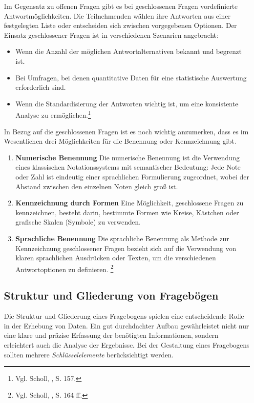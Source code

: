 Im Gegensatz zu offenen Fragen gibt es bei geschlossenen Fragen vordefinierte Antwortmöglichkeiten. Die Teilnehmenden
wählen ihre Antworten aus einer festgelegten Liste oder entscheiden sich zwischen vorgegebenen Optionen. Der Einsatz
geschlossener Fragen ist in verschiedenen Szenarien angebracht:

\begin{itemize}
    \item Wenn die Anzahl der möglichen Antwortalternativen bekannt und begrenzt ist.
    \item Bei Umfragen, bei denen quantitative Daten für eine statistische Auswertung erforderlich sind.
    \item Wenn die Standardisierung der Antworten wichtig ist, um eine konsistente Analyse zu ermöglichen.\footnote{Vgl. Scholl, \cite{Die Befragung}, S. 157.}\\
\end{itemize}

In Bezug auf die geschlossenen Fragen ist es noch wichtig anzumerken, dass es im Wesentlichen drei Möglichkeiten für die
Benennung oder Kennzeichnung gibt.
\begin{enumerate}
    \item \textbf{Numerische Benennung}
    Die numerische Benennung ist die Verwendung eines klassischen Notationssystems mit semantischer Bedeutung: Jede Note
    oder Zahl ist eindeutig einer sprachlichen Formulierung zugeordnet, wobei der Abstand zwischen den einzelnen Noten gleich groß ist.
    \item \textbf{Kennzeichnung durch Formen}
    Eine Möglichkeit, geschlossene Fragen zu kennzeichnen, besteht darin, bestimmte Formen wie Kreise, Kästchen oder
    grafische Skalen (Symbole) zu verwenden.
    \item \textbf{Sprachliche Benennung}
    Die sprachliche Benennung als Methode zur Kennzeichnung geschlossener Fragen bezieht sich auf die Verwendung von
    klaren sprachlichen Ausdrücken oder Texten, um die verschiedenen Antwortoptionen zu definieren. \footnote{Vgl. Scholl, \cite{Die Befragung}, S. 164 ff.}
\end{enumerate}


\subsection{Struktur und Gliederung von Fragebögen}
Die Struktur und Gliederung eines Fragebogens spielen eine entscheidende Rolle in der Erhebung von Daten. Ein gut
durchdachter Aufbau gewährleistet nicht nur eine klare und präzise Erfassung der benötigten Informationen, sondern
erleichtert auch die Analyse der Ergebnisse. Bei der Gestaltung eines Fragebogens sollten mehrere \textit{Schlüsselelemente}
berücksichtigt werden.

